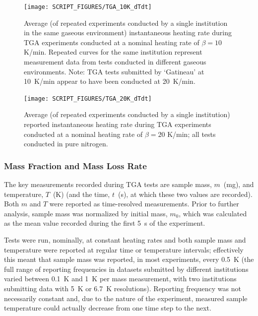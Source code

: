 \documentclass{book}
\begin{document}
\begin{figure}
  \centering
  \texttt{[image: SCRIPT\_FIGURES/TGA\_10K\_dTdt]}
  \caption{Average (of repeated experiments conducted by a single institution in the same gaseous environment) instantaneous heating rate during TGA experiments conducted at a nominal heating rate of $\beta=10$ K/min. Repeated curves for the same institution represent measurement data from tests conducted in different gaseous environments. Note: TGA tests submitted by ‘Gatineau’ at 10~K/min appear to have been conducted at 20~K/min.}
  \label{Fig:TGA_10K_dTdt}
\end{figure}

\begin{figure}
  \centering
  \texttt{[image: SCRIPT\_FIGURES/TGA\_20K\_dTdt]}
  \caption{Average (of repeated experiments conducted by a single institution) reported instantaneous heating rate during TGA experiments conducted at a nominal heating rate of $\beta=20$ K/min; all tests conducted in pure nitrogen.}
  \label{Fig:TGA_20K_dTdt}
\end{figure}


\subsubsection{Mass Fraction and Mass Loss Rate}

The key measurements recorded during TGA tests are sample mass, $m$~(mg), and temperature, $T$~(K) (and the time, $t$~(s), at which these two values are recorded).  Both $m$ and $T$ were reported as time-resolved measurements. Prior to further analysis, sample mass was normalized by initial mass, $m_0$, which was calculated as the mean value recorded during the first 5~s of the experiment.

Tests were run, nominally, at constant heating rates and both sample mass and temperature were reported at regular time or temperature intervals; effectively this meant that sample mass was reported, in most experiments, every 0.5~K (the full range of reporting frequencies in datasets submitted by different institutions varied between 0.1~K and 1~K per mass measurement, with two institutions submitting data with 5~K or 6.7~K resolutions). Reporting frequency was not necessarily constant and, due to the nature of the experiment, measured sample temperature could actually decrease from one time step to the next.
\end{document}
